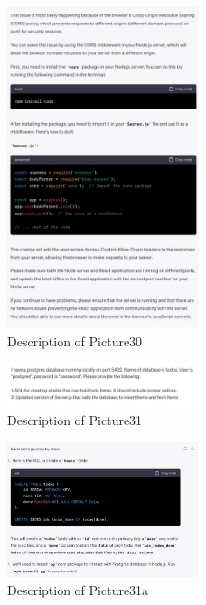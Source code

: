 \documentclass[runningheads]{llncs}
\begin{document}
\begin{figure}[h]
    \centering
    \includegraphics[width=0.5\textwidth]{Pictures/Picture30.jpg}
    \caption{Description of Picture30}
    \label{fig:picture30}
\end{figure}
\begin{figure}[h]
    \centering
    \includegraphics[width=0.5\textwidth]{Pictures/Picture31.jpg}
    \caption{Description of Picture31}
    \label{fig:picture31}
\end{figure}
\begin{figure}[h]
    \centering
    \includegraphics[width=0.5\textwidth]{Pictures/Picture31a.jpg}
    \caption{Description of Picture31a}
    \label{fig:picture31a}
\end{figure}
\end{document}
